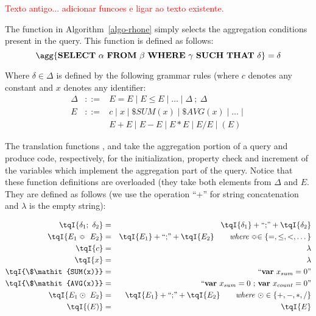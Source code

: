 


\textcolor{red}{Texto antigo... adicionar funcoes e ligar ao texto existente.} 
 
 The function \agg{\_} in Algorithm~\ref{algo-rhone} simply selects the aggregation conditions present in the query. 
This function is defined as follows:
\[
\agg{\mathbf{SELECT}\ \alpha\ \mathbf{FROM}\ \beta\ \mathbf{WHERE}\ \gamma\ \mathbf{SUCH\ THAT}\ \delta} = \delta 
\]

Where $\delta \in \Delta$ is defined by the following grammar rules (where $c$ denotes any constant and $x$ denotes any identifier:
\begin{eqnarray*}
\Delta & ::= & E = E \mid E \leq E \mid \dots \mid \Delta\ ;\ \Delta   \\
E      & ::= & c \mid x \mid \$\mathit{SUM(x)} \mid \$\mathit{AVG(x)} \mid \dots \mid \\
       &     & E + E \mid E - E \mid E * E \mid E / E \mid ( E )
\end{eqnarray*}

The translation functions \tqI{\_}, \tqT{\_} and \tqS{\_} take the aggregation portion of a query and produce code, respectively, for the initialization, property check and increment of the variables which implement the aggregation part of the query.
Notice that these function definitions are overloaded (they take both elements from $\Delta$ and $E$.
They are defined as follows (we use the operation ``+'' for string concatenation and $\lambda$ is the empty string):

\begin{eqnarray*}
\tqI{\delta_1 ; \ \delta_2}	& = & \tqI{\delta_1} + \hbox{``;''} + \tqI{\delta_2} \\
\tqI{E_1 \Bumpeq \ E_2} 		& = & \tqI{E_1} + \hbox{``;''} + \tqI{E_2}
									\qquad \mathit{where} \Bumpeq \in \{ =, \leq, <, \dots \}\\
\tqI{c} 						& = & \lambda \\
\tqI{x} 						& = & \lambda \\
\tqI{\$\mathit{SUM(x)}}	 	& = & \hbox{``\textbf{var} $x_{sum} = 0$''} \\
\tqI{\$\mathit{AVG(x)}}	 	& = & \hbox{``\textbf{var} $x_{sum} = 0$ ; \textbf{var} $x_{count} = 0$''} \\
\tqI{E_1 \odot \ E_2} 		& = & \tqI{E_1} + \hbox{``;''} + \tqI{E_2} 
									\qquad \mathit{where}\ \odot \in \{ +, -, *, / \}\\
\tqI{( E )} 					& = & \tqI{E} 
\end{eqnarray*}

